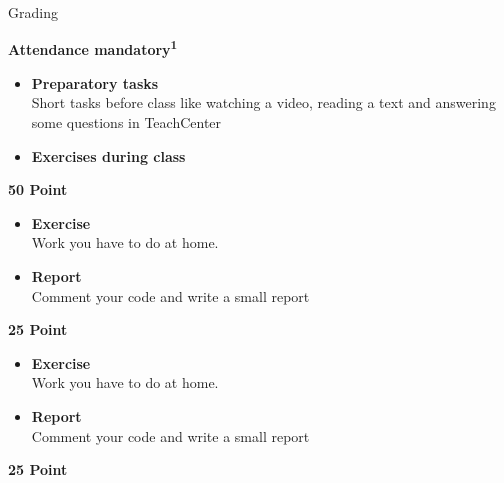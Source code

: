 \documentclass[aspectratio=169]{beamer}
\begin{document}
\begin{frame}{Grading}
    \begin{coloredblock}[blue]
        \centering\footnotesize\textbf{Attendance mandatory\textsuperscript{1}}
    \end{coloredblock}

    \vspace{-0.5cm}
    \begin{minipage}[t][9.5cm]{\textwidth}
        \begin{minipage}[t]{0.32\textwidth}
            \begin{coloredblock}
                \begin{itemize}
                    \item \footnotesize \textbf{Preparatory tasks}\\
                    Short tasks before class like watching a video, reading a text and answering some questions in TeachCenter
                    \item \footnotesize \textbf{Exercises during class}
                \end{itemize}
            \end{coloredblock}
            \centering \footnotesize \textbf{50 Point}
        \end{minipage}
        \hfill
        \begin{minipage}[t]{0.32\textwidth}
            \begin{coloredblock}
                \begin{itemize}
                    \item \footnotesize \textbf{Exercise}\\
                    Work you have to do at home.
                    \item \footnotesize \textbf{Report}\\
                    Comment your code and write a small report
                \end{itemize}
            \end{coloredblock}
            \centering \footnotesize \textbf{25 Point}
        \end{minipage}
        \hfill
        \begin{minipage}[t]{0.32\textwidth}
            \begin{coloredblock}
                \begin{itemize}
                    \item \footnotesize \textbf{Exercise}\\
                    Work you have to do at home.
                    \item \footnotesize \textbf{Report}\\
                    Comment your code and write a small report
                \end{itemize}
            \end{coloredblock}
            \centering \footnotesize \textbf{25 Point}
        \end{minipage}
    \end{minipage}
    

\end{frame}
\end{document}
